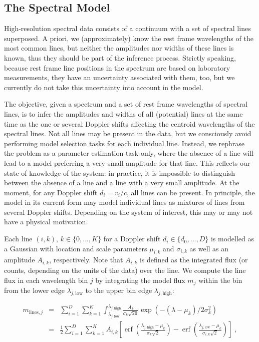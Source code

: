\documentclass[12pt]{emulateapj}
\newcommand{\mean}{m}
\DeclareMathOperator\erf{erf}
\begin{document}
\subsection{The Spectral Model}
High-resolution spectral data consists of a continuum with a set of spectral lines superposed. A priori, we (approximately) know the rest frame wavelengths of the most common lines, but neither the amplitudes nor widths of these lines is known, thus they should be part of the inference process. Strictly speaking, because rest frame line positions in the spectrum are based on laboratory measurements, they have an uncertainty associated with them, too, but we currently do not take this uncertainty into account in the model.

The objective, given a spectrum and a set of rest frame wavelengths of spectral lines, is to infer the amplitudes and widths of all (potential) lines at the same time as the one or several Doppler shifts affecting the centroid wavelengths of the spectral lines. Not all lines may be present in the data, but we consciously avoid performing model selection tasks for each individual line. Instead, we rephrase the problem as a parameter estimation task only, where the absence of a line will lead to a model preferring a very small amplitude for that line. This reflects our state of knowledge of the system: in practice, it is impossible to distinguish between the absence of a line and a line with a very small amplitude.
At the moment, for any Doppler shift $d_i = v_i/c$, all lines can be present. In principle, the model in its current form may model individual lines as mixtures of lines from several Doppler shifts. Depending on the system of interest, this may or may not have a physical motivation. 

Each line $(i,k), \, k \in \{0, ..., K\}$ for a Doppler shift $d_i \in \{d_0, ..., D\}$ is modelled as a Gaussian with location and scale parameters $\mu_{i,k}$ and $\sigma_{i,k}$ as well as an amplitude $A_{i,k}$, respectively. Note that $A_{i,k}$ is defined as the integrated flux (or counts, depending on the units of the data) over the line. We compute the line flux in each wavelength bin $j$ by integrating the model flux $\mean_j$ within the bin from the lower edge $\lambda_{j, \mathrm{low}}$ to the upper bin edge $\lambda_{j, \mathrm{high}}$:

\begin{eqnarray}
\mean_{\mathrm{lines},j} & = &  \sum_{i=1}^{D}\sum_{k=1}^{K}{\int^{\lambda_{j,\mathrm{high}}}_{\lambda_{j, \mathrm{low}}}{\frac{A_{k}}{\sigma_{k}\sqrt{2\pi}} \exp{(-(\lambda-\mu_{k})/{2\sigma_{k}^2})}}} \\ \nonumber
& = & \frac{1}{2}  \sum_{i=1}^{D} \sum_{k=1}^{K} A_{i,k}\left[ \erf{\left( \frac{\lambda_{j,\mathrm{high}} - \mu_{k}}{\sigma_{k}\sqrt{2}}\right)} - \erf{\left( \frac{\lambda_{j, \mathrm{low}} - \mu_{k}}{\sigma_{i,k}\sqrt{2}}\right)} \right] \; ,
\end{eqnarray}
\end{document}
